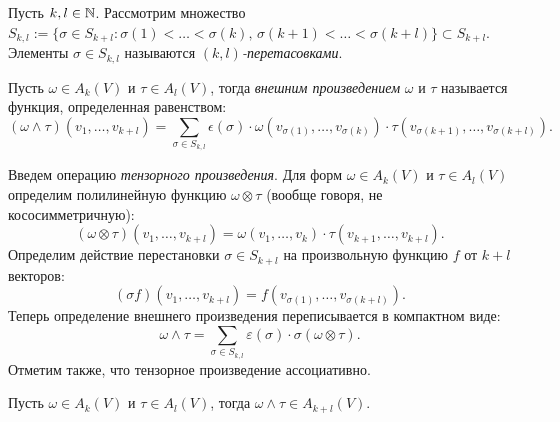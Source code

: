 
\begin{definition}
	Пусть $k, l \in \mathbb{N}$. Рассмотрим множество $S_{k, l} := \{\sigma \in S_{k+l} : \sigma(1) < \dotsc < \sigma(k), \, \sigma(k+1) < \dotsc < \sigma(k+l)\} \subset S_{k+l}$. 
	Элементы $\sigma \in S_{k, l}$ называются \textit{$(k, l)$-перетасовками}.
\end{definition}


\begin{definition}
	Пусть $\omega \in A_k(V)$ и $\tau \in A_l(V)$, тогда \textit{внешним произведением} $\omega$ и $\tau$ называется функция, определенная равенством:
	\[ (\omega \wedge \tau) (v_1, \dotsc, v_{k+l}) = \sum_{\sigma \in S_{k, l}} \epsilon(\sigma) \cdot \omega(v_{\sigma(1)}, \dotsc, v_{\sigma(k)}) \cdot \tau(v_{\sigma(k+1)}, \dotsc, v_{\sigma(k+l)}). \]
\end{definition}

\begin{note}
	Введем операцию \textit{тензорного произведения}. Для форм $\omega \in A_k(V)$ и $\tau \in A_l(V)$ определим полилинейную функцию $\omega \otimes \tau$ (вообще говоря, не кососимметричную):
	\[ (\omega \otimes \tau)(v_1, \dotsc, v_{k+l}) = \omega(v_1, \dotsc, v_k) \cdot \tau(v_{k+1}, \dotsc, v_{k+l}). \]
	Определим действие перестановки $\sigma \in S_{k+l}$ на произвольную функцию $f$ от $k+l$ векторов:
	\[ (\sigma f)(v_1, \dotsc, v_{k+l}) = f(v_{\sigma(1)}, \dotsc, v_{\sigma(k+l)}). \]
	Теперь определение внешнего произведения переписывается в компактном виде:
	\[ \omega \wedge \tau = \sum_{\sigma \in S_{k, l}} \varepsilon(\sigma) \cdot \sigma(\omega \otimes \tau). \]
	Отметим также, что тензорное произведение ассоциативно.
\end{note}

\begin{note}
	Пусть $\omega \in A_k(V)$ и $\tau \in A_l(V)$, тогда $\omega \wedge \tau \in A_{k+l}(V)$.
\end{note}

